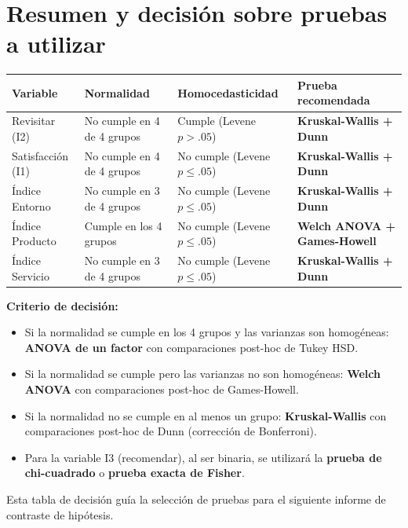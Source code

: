 \documentclass[
  spanish,
]{article}
\begin{document}
\newpage

\section{Resumen y decisión sobre pruebas a
utilizar}\label{resumen-y-decisiuxf3n-sobre-pruebas-a-utilizar}

\begin{table}[!h]
\centering\begingroup\fontsize{9}{11}\selectfont

\begin{tabular}{lll>{}l}
\toprule
Variable & Normalidad & Homocedasticidad & Prueba recomendada\\
\midrule
Revisitar (I2) & No cumple en 4 de 4 grupos & Cumple (Levene $p > .05$) & \textbf{Kruskal-Wallis + Dunn}\\
Satisfacción (I1) & No cumple en 4 de 4 grupos & No cumple (Levene $p \leq .05$) & \textbf{Kruskal-Wallis + Dunn}\\
Índice Entorno & No cumple en 3 de 4 grupos & No cumple (Levene $p \leq .05$) & \textbf{Kruskal-Wallis + Dunn}\\
Índice Producto & Cumple en los 4 grupos & No cumple (Levene $p \leq .05$) & \textbf{Welch ANOVA + Games-Howell}\\
Índice Servicio & No cumple en 3 de 4 grupos & No cumple (Levene $p \leq .05$) & \textbf{Kruskal-Wallis + Dunn}\\
\bottomrule
\end{tabular}
\endgroup{}
\end{table}

\textbf{Criterio de decisión:}

\begin{itemize}
  \item Si la normalidad se cumple en los 4 grupos y las varianzas son homogéneas: \textbf{ANOVA de un factor} con comparaciones post-hoc de Tukey HSD.
  \item Si la normalidad se cumple pero las varianzas no son homogéneas: \textbf{Welch ANOVA} con comparaciones post-hoc de Games-Howell.
  \item Si la normalidad no se cumple en al menos un grupo: \textbf{Kruskal-Wallis} con comparaciones post-hoc de Dunn (corrección de Bonferroni).
  \item Para la variable I3 (recomendar), al ser binaria, se utilizará la \textbf{prueba de chi-cuadrado} o \textbf{prueba exacta de Fisher}.
\end{itemize}

Esta tabla de decisión guía la selección de pruebas para el siguiente
informe de contraste de hipótesis.
\end{document}
